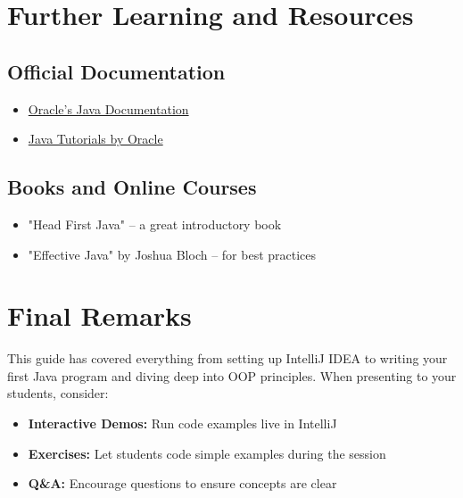 \documentclass[11pt,a4paper]{article}
\begin{document}

\section{Further Learning and Resources}

\subsection{Official Documentation}
\begin{itemize}
    \item \href{https://docs.oracle.com/en/java/}{Oracle's Java Documentation}
    \item \href{https://docs.oracle.com/javase/tutorial/}{Java Tutorials by Oracle}
\end{itemize}

\subsection{Books and Online Courses}
\begin{itemize}
    \item "Head First Java" – a great introductory book
    \item "Effective Java" by Joshua Bloch – for best practices
\end{itemize}

\section{Final Remarks}
This guide has covered everything from setting up IntelliJ IDEA to writing your first Java program and diving deep into OOP principles. When presenting to your students, consider:
\begin{itemize}
    \item \textbf{Interactive Demos:} Run code examples live in IntelliJ
    \item \textbf{Exercises:} Let students code simple examples during the session
    \item \textbf{Q\&A:} Encourage questions to ensure concepts are clear
\end{itemize}
\end{document}
